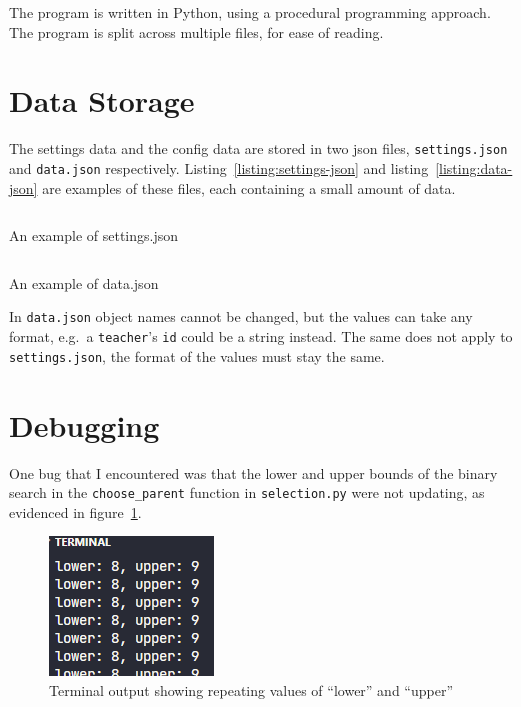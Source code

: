 The program is written in Python, using a procedural programming approach.
The program is split across multiple files, for ease of reading.

\section{Data Storage}

The settings data and the config data are stored in two json files, 
\verb|settings.json| and \verb|data.json| respectively.
Listing~\ref*{listing:settings-json} and listing~\ref*{listing:data-json} are
examples of these files, each containing a small amount of data.

\begin{listing}[!ht]
	\inputminted[linenos, fontsize=\footnotesize]{json}{code/settings_template.json}
	\caption{An example of settings.json}
	\label{listing:settings-json}
\end{listing}

\begin{listing}[!ht]
	\inputminted[linenos, fontsize=\footnotesize]{json}{code/data_template.json}
	\caption{An example of data.json}
	\label{listing:data-json}
\end{listing}

In \verb|data.json| object names cannot be changed, but the values can take any 
format, e.g.\ a \verb|teacher|'s \verb|id| could be a string instead.
The same does not apply to \verb|settings.json|, the format of the values must 
stay the same.

\newpage

\section{Debugging}

One bug that I encountered was that the lower and upper bounds of the binary 
search in the \verb|choose_parent| function in \verb|selection.py| were not
updating, as evidenced in figure~\ref*{fig:terminal-output-1}.
\begin{figure}[ht]
	\centering
	\includegraphics[scale=0.8]{images/binary-search-2}
	\caption{Terminal output showing repeating values of ``lower'' and 
		``upper''}
	\label{fig:terminal-output-1}
\end{figure}


